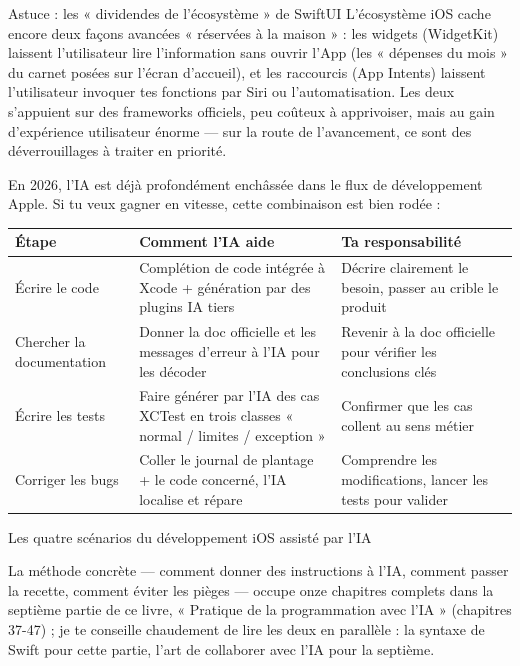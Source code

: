 \begin{tcbinfo}{Astuce : les « dividendes de l'écosystème » de SwiftUI}
L'écosystème iOS cache encore deux façons avancées « réservées à la maison » : les widgets (WidgetKit) laissent l'utilisateur lire l'information sans ouvrir l'App (les « dépenses du mois » du carnet posées sur l'écran d'accueil), et les raccourcis (App Intents) laissent l'utilisateur invoquer tes fonctions par Siri ou l'automatisation. Les deux s'appuient sur des frameworks officiels, peu coûteux à apprivoiser, mais au gain d'expérience utilisateur énorme — sur la route de l'avancement, ce sont des déverrouillages à traiter en priorité.

\end{tcbinfo}


En 2026, l'IA est déjà profondément enchâssée dans le flux de développement Apple. Si tu veux gagner en vitesse, cette combinaison est bien rodée :

\begin{center}
\begin{tabularx}{\linewidth}{|X|X|X|}
\hline
\textbf{Étape} & \textbf{Comment l'IA aide} & \textbf{Ta responsabilité} \tabularnewline
\hline
Écrire le code & Complétion de code intégrée à Xcode + génération par des plugins IA tiers & Décrire clairement le besoin, passer au crible le produit \tabularnewline
Chercher la documentation & Donner la doc officielle et les messages d'erreur à l'IA pour les décoder & Revenir à la doc officielle pour vérifier les conclusions clés \tabularnewline
Écrire les tests & Faire générer par l'IA des cas XCTest en trois classes « normal / limites / exception » & Confirmer que les cas collent au sens métier \tabularnewline
Corriger les bugs & Coller le journal de plantage + le code concerné, l'IA localise et répare & Comprendre les modifications, lancer les tests pour valider \tabularnewline
\hline
\end{tabularx}
\end{center}

\begin{center}\small\color{gray}Les quatre scénarios du développement iOS assisté par l'IA\end{center}

La méthode concrète — comment donner des instructions à l'IA, comment passer la recette, comment éviter les pièges — occupe onze chapitres complets dans la septième partie de ce livre, « Pratique de la programmation avec l'IA » (chapitres 37-47) ; je te conseille chaudement de lire les deux en parallèle : la syntaxe de Swift pour cette partie, l'art de collaborer avec l'IA pour la septième.

